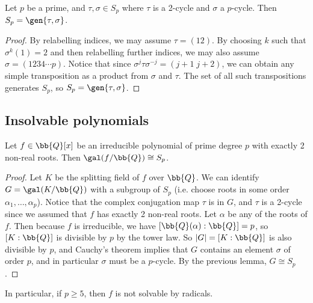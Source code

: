 \begin{lemma}
    Let $p$ be a prime, and $\tau, \sigma \in S_p$ where $\tau$ is a 2-cycle and $\sigma$ a $p$-cycle. Then $S_p = \gen{\tau, \sigma}$.
\end{lemma}

\begin{proof}
    By relabelling indices, we may assume $\tau = (12)$. By choosing $k$ such that $\sigma^k(1) = 2$ and then relabelling further indices, we may also assume $\sigma = (1234 \cdots p)$. Notice that since $\sigma^j \tau \sigma^{-j} = (j + 1 \; j + 2)$, we can obtain any simple transposition as a product from $\sigma$ and $\tau$. The set of all such transpositions generates $S_p$, so $S_p = \gen{\tau, \sigma}$.
\end{proof}

\subsection{Insolvable polynomials}

\begin{proposition}
    Let $f \in \bb{Q}[x]$ be an irreducible polynomial of prime degree $p$ with exactly 2 non-real roots. Then $\gal(f/\bb{Q}) \cong S_p$.
\end{proposition}

\begin{proof}
    Let $K$ be the splitting field of $f$ over $\bb{Q}$. We can identify $G = \gal(K/\bb{Q})$ with a subgroup of $S_p$ (i.e. choose roots in some order $\alpha_1, \ldots, \alpha_p$). Notice that the complex conjugation map $\tau$ is in $G$, and $\tau$ is a 2-cycle since we assumed that $f$ has exactly 2 non-real roots. Let $\alpha$ be any of the roots of $f$. Then because $f$ is irreducible, we have $[\bb{Q}(\alpha) : \bb{Q}] = p$, so $[K : \bb{Q}]$ is divisible by $p$ by the tower law. So $|G| = [K : \bb{Q}]$ is also divisible by $p$, and Cauchy's theorem implies that $G$ contains an element $\sigma$ of order $p$, and in particular $\sigma$ must be a $p$-cycle. By the previous lemma, $G \cong S_p$.
\end{proof}

\begin{remark}
    In particular, if $p \geq 5$, then $f$ is not solvable by radicals.
\end{remark}

